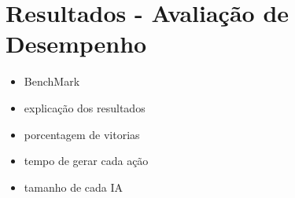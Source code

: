 
\chapter{\label{chap:ativ}Resultados - Avaliação de Desempenho}


\begin{itemize}
	\item BenchMark
	\item explicação dos resultados
	\item porcentagem de vitorias
	\item tempo de gerar cada ação
	\item tamanho de cada IA	
\end{itemize}

